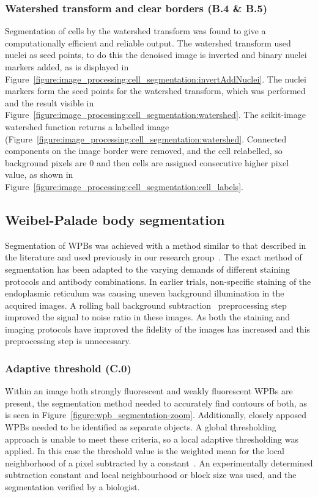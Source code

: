 \subsubsection{Watershed transform and clear borders (B.4 \& B.5)}
Segmentation of cells by the watershed transform was found to give a computationally efficient and reliable output. The watershed transform used nuclei as seed points, to do this the denoised image is inverted and binary nuclei markers added, as is displayed in Figure~\ref{figure:image_processing:cell_segmentation:invertAddNuclei}. The nuclei markers form the seed points for the watershed transform, which was performed and the result visible in Figure~\ref{figure:image_processing:cell_segmentation:watershed}. The scikit-image watershed function returns a labelled image (Figure~\ref{figure:image_processing:cell_segmentation:watershed}. Connected components on the image border were removed, and the cell relabelled, so background pixels are 0 and then cells are assigned consecutive higher pixel value, as shown in Figure~\ref{figure:image_processing:cell_segmentation:cell_labels}.

\subsection{Weibel-Palade body segmentation}
\label{endothelial_morphometry:image_processing:wpb}
Segmentation of WPBs was achieved with a method similar to that described in the literature and used previously in our research group~\cite{Ferraro2014, Stevenson2014}. The exact method of segmentation has been adapted to the varying demands of different staining protocols and antibody combinations. In earlier trials, non-specific staining of the endoplasmic reticulum was causing uneven background illumination in the acquired images. A rolling ball background subtraction~\cite{Sternberg1983} preprocessing step improved the signal to noise ratio in these images. As both the staining and imaging protocols have improved the fidelity of the images has increased and this preprocessing step is unnecessary.

\subsubsection{Adaptive threshold (C.0)}
Within an image both strongly fluorescent and weakly fluorescent WPBs are present, the segmentation method needed to accurately find contours of both, as is seen in Figure~\ref{figure:wpb_segmentation-zoom}. Additionally, closely apposed WPBs needed to be identified as separate objects. A global thresholding approach is unable to meet these criteria, so a local adaptive thresholding was applied. In this case the threshold value is the weighted mean for the local neighborhood of a pixel subtracted by a constant~\cite{scikit-image}. An experimentally determined subtraction constant and local neighbourhood or block size was used, and the segmentation verified by a biologist.

